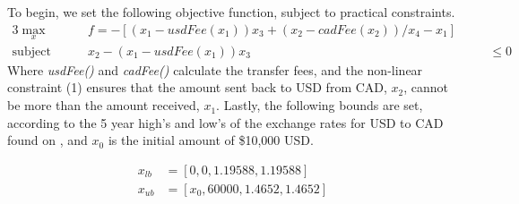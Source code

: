 \documentclass[12pt]{article}
\begin{document}
To begin, we set the following objective function, subject to practical constraints.
\begin{alignat}{3}
\max_x              &\quad&  f = -[ (x_{1} - usdFee(x_{1}))x_{3} + (x_{2} - cadFee(x_{2}))/x_{4} - x_{1} ]  &          & \\
\text{subject to: } &  &  x_{2} - (x_{1}-usdFee(x_{1}))x_{3}  && \quad \leq 0 &
\end{alignat}
Where \textit{usdFee()} and \textit{cadFee()} calculate the transfer fees, and the non-linear constraint (1) ensures that the amount sent back to USD from CAD, $x_{2}$, cannot be more than the amount received, $x_{1}$. Lastly, the following bounds are set, according to the 5 year high's and low's of the exchange rates for USD to CAD found on \cite{xe}, and $x_{0}$ is the initial amount of \$10,000 USD.

\begin{equation}
\begin{split}
x_{lb} & = [0, 0, 1.19588, 1.19588]\\
x_{ub} & = [x_{0}, 60000, 1.4652, 1.4652] 
\end{split}
\end{equation}
\end{document}

